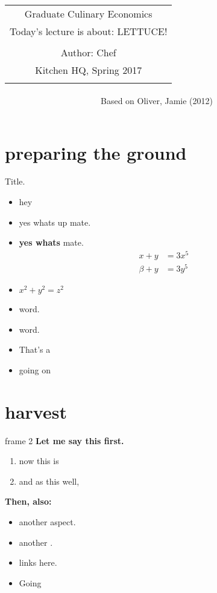 \documentclass{beamer}%
\begin{document}
\title{%
\begin{tabular}{c}
\\ 
{\small Graduate Culinary Economics}\\
Today's lecture is about: LETTUCE! \\
\\
{\small Author: Chef}
\\
{\small Kitchen HQ, Spring 2017}\\
\\
\end{tabular}%
}
\subtitle{Based on Oliver, Jamie (2012)}


\frame{\titlepage} 


\section{preparing the ground}

\begin{frame}{Title.}
\begin{itemize}
	\item hey
	\item yes whats up mate.
	\item \textbf{yes whats } mate.
	\begin{align}
	x + y &= 3x^5	\label{eq:1}\\
	\beta + y &= 3y^5	\nonumber
	\end{align}

 	\item $x^2 + y^2 = z^2\label{eq:2}$	
 	\item {} word.
 	\item {} word.
 	\item That's a 
	\item \hypertarget{link-return}{going on}
 \end{itemize}
\end{frame}

\section{harvest}

\begin{frame}{frame 2}
\textbf{Let me say this first.}
\begin{enumerate}
	\item now this is 
	\item and as this well, \citet{mortensen2005wage}
\end{enumerate}
\pause
\vspace{.5cm}
\textbf{Then, also:}
\begin{itemize}
	\item another  aspect.
	\item another .
	\item \hypertarget{link-label}{links here.}
	\item Going 
\end{itemize}
\end{frame}
\end{document}

